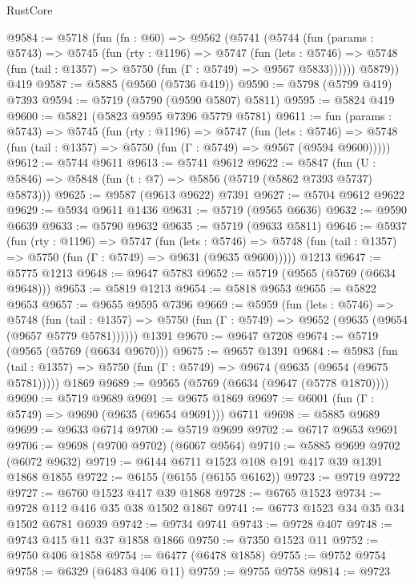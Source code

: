 \begin{lexlean}{RustCore}
\begin{coremodule}
@9584 := @5718
    (fun (fn : @60) =>
    @9562
      (@5741
        (@5744
          (fun (params : @5743) =>
          @5745
            (fun (rty : @1196) =>
            @5747
              (fun (lets : @5746) =>
              @5748 (fun (tail : @1357) => @5750 (fun (Γ : @5749) => @9567 @5833))))))
        @5879))
    @419
@9587 := @5885 (@9560 (@5736 @419))
@9590 := @5798 (@5799 @419) @7393
@9594 := @5719 (@5790 (@9590 @5807) @5811)
@9595 := @5824 @419
@9600 := @5821 (@5823 @9595 @7396 @5779 @5781)
@9611 := fun (params : @5743) =>
  @5745
    (fun (rty : @1196) =>
    @5747
      (fun (lets : @5746) =>
      @5748 (fun (tail : @1357) => @5750 (fun (Γ : @5749) => @9567 (@9594 @9600)))))
@9612 := @5744 @9611
@9613 := @5741 @9612
@9622 := @5847 (fun (U : @5846) => @5848 (fun (t : @7) => @5856 (@5719 (@5862 @7393 @5737) @5873)))
@9625 := @9587 (@9613 @9622) @7391
@9627 := @5704 @9612 @9622
@9629 := @5934 @9611 @1436
@9631 := @5719 (@9565 @6636)
@9632 := @9590 @6639
@9633 := @5790 @9632
@9635 := @5719 (@9633 @5811)
@9646 := @5937
    (fun (rty : @1196) =>
    @5747
      (fun (lets : @5746) =>
      @5748 (fun (tail : @1357) => @5750 (fun (Γ : @5749) => @9631 (@9635 @9600)))))
    @1213
@9647 := @5775 @1213
@9648 := @9647 @5783
@9652 := @5719 (@9565 (@5769 (@6634 @9648)))
@9653 := @5819 @1213
@9654 := @5818 @9653
@9655 := @5822 @9653
@9657 := @9655 @9595 @7396
@9669 := @5959
    (fun (lets : @5746) =>
    @5748
      (fun (tail : @1357) => @5750 (fun (Γ : @5749) => @9652 (@9635 (@9654 (@9657 @5779 @5781))))))
    @1391
@9670 := @9647 @7208
@9674 := @5719 (@9565 (@5769 (@6634 @9670)))
@9675 := @9657 @1391
@9684 := @5983
    (fun (tail : @1357) => @5750 (fun (Γ : @5749) => @9674 (@9635 (@9654 (@9675 @5781)))))
    @1869
@9689 := @9565 (@5769 (@6634 (@9647 (@5778 @1870))))
@9690 := @5719 @9689
@9691 := @9675 @1869
@9697 := @6001 (fun (Γ : @5749) => @9690 (@9635 (@9654 @9691))) @6711
@9698 := @5885 @9689
@9699 := @9633 @6714
@9700 := @5719 @9699
@9702 := @6717 @9653 @9691
@9706 := @9698 (@9700 @9702) (@6067 @9564)
@9710 := @5885 @9699 @9702 (@6072 @9632)
@9719 := @6144 @6711 @1523 @108 @191 @417 @39 @1391 @1868 @1855
@9722 := @6155 (@6155 (@6155 @6162))
@9723 := @9719 @9722
@9727 := @6760 @1523 @417 @39 @1868
@9728 := @6765 @1523
@9734 := @9728 @112 @416 @35 @38 @1502 @1867
@9741 := @6773 @1523 @34 @35 @34 @1502 @6781 @6939
@9742 := @9734 @9741
@9743 := @9728 @407
@9748 := @9743 @415 @11 @37 @1858 @1866
@9750 := @7350 @1523 @11
@9752 := @9750 @406 @1858
@9754 := @6477 (@6478 @1858)
@9755 := @9752 @9754
@9758 := @6329 (@6483 @406 @11)
@9759 := @9755 @9758
@9814 := @9723

\end{coremodule}
\end{lexlean}
